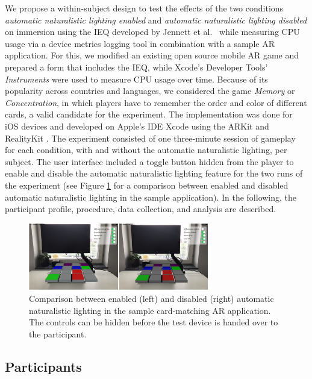 \documentclass[12pt,twoside,english]{article}
\begin{document}
We propose a within-subject design to test the effects of the two conditions \textit{automatic naturalistic lighting enabled} and \textit{automatic naturalistic lighting disabled} on immersion using the \gls{IEQ} developed by Jennett et al.~\cite{jennett_measuring_2008} while measuring \gls{CPU} usage via a device metrics logging tool in combination with a sample \gls{AR} application.
For this, we modified an existing open source mobile \gls{AR} game and prepared a form that includes the \gls{IEQ}, while Xcode's Developer Tools' \textit{Instruments} were used to measure \gls{CPU} usage over time.
Because of its popularity across countries and languages, we considered the game \textit{Memory} or \textit{Concentration}, in which players have to remember the order and color of different cards, a valid candidate for the experiment.
The implementation was done for iOS devices and developed on Apple's \gls{IDE} Xcode using the ARKit and RealityKit .
The experiment consisted of one three-minute session of gameplay for each condition, with and without the automatic naturalistic lighting, per subject.
The user interface included a toggle button hidden from the player to enable and disable the automatic naturalistic lighting feature for the two runs of the experiment (see Figure \ref{fig:sample_app_comparison} for a comparison between enabled and disabled automatic naturalistic lighting in the sample application).
In the following, the participant profile, procedure, data collection, and analysis are described.

\begin{figure}[h]
    \centering
    \includegraphics[width=0.7\textwidth]{imgs/sample_app_comparison.png}
    \caption{Comparison between enabled (left) and disabled (right) automatic naturalistic lighting in the sample card-matching \gls{AR} application. The controls can be hidden before the test device is handed over to the participant.}
    \label{fig:sample_app_comparison}
\end{figure}

\subsection{Participants}
\label{sect:participants}
\end{document}
